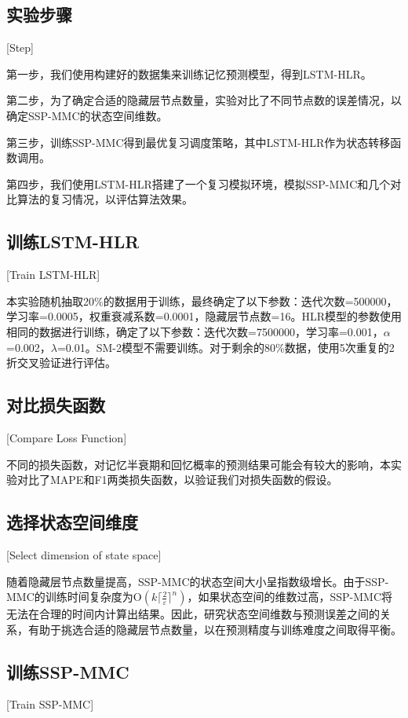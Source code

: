 \subsection{实验步骤}[Step]

第一步，我们使用构建好的数据集来训练记忆预测模型，得到LSTM-HLR。

第二步，为了确定合适的隐藏层节点数量，实验对比了不同节点数的误差情况，以确定SSP-MMC的状态空间维数。

第三步，训练SSP-MMC得到最优复习调度策略，其中LSTM-HLR作为状态转移函数调用。

第四步，我们使用LSTM-HLR搭建了一个复习模拟环境，模拟SSP-MMC和几个对比算法的复习情况，以评估算法效果。

\subsection{训练LSTM-HLR}[Train LSTM-HLR]

本实验随机抽取20\%的数据用于训练，最终确定了以下参数：迭代次数=500000，学习率=0.0005，权重衰减系数=0.0001，隐藏层节点数=16。HLR模型的参数使用相同的数据进行训练，确定了以下参数：迭代次数=7500000，学习率=0.001，$\alpha$=0.002，$\lambda$=0.01。SM-2模型不需要训练。对于剩余的80\%数据，使用5次重复的2折交叉验证\cite{dietterichApproximateStatisticalTests1998}进行评估。

\subsection{对比损失函数}[Compare Loss Function]

不同的损失函数，对记忆半衰期和回忆概率的预测结果可能会有较大的影响，本实验对比了MAPE和F1两类损失函数，以验证我们对损失函数的假设。

\subsection{选择状态空间维度}[Select dimension of state space]

随着隐藏层节点数量提高，SSP-MMC的状态空间大小呈指数级增长。由于SSP-MMC的训练时间复杂度为$\mathrm O(k\lceil\frac{2}{\varepsilon}\rceil^n)$，如果状态空间的维数过高，SSP-MMC将无法在合理的时间内计算出结果。因此，研究状态空间维数与预测误差之间的关系，有助于挑选合适的隐藏层节点数量，以在预测精度与训练难度之间取得平衡。

\subsection{训练SSP-MMC}[Train SSP-MMC]

